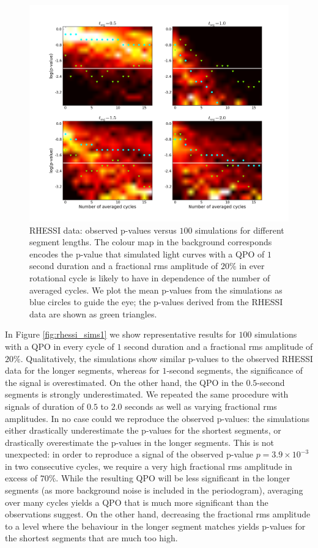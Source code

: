 \documentclass{emulateapj}
\begin{document}
\begin{figure}[htbp]
\begin{center}
\includegraphics[width=\textwidth]{1806_rhessi_1ssignal_all_pvalues.png}
\caption{RHESSI data: observed p-values versus $100$ simulations for different segment lengths. The colour map in the background corresponds encodes the p-value that simulated light curves with a QPO of $1$ second duration and a fractional rms amplitude of $20\%$ in ever rotational cycle is likely to have in dependence of the number of averaged cycles. We plot the mean p-values from the simulations as blue circles to guide the eye; the p-values derived from the RHESSI data are shown as green triangles.}
\label{fig:rhessi_sims1_pvalues}
\end{center}
\end{figure}

In Figure \ref{fig:rhessi_sims1} we show representative results for $100$ simulations with a QPO in every cycle of $1$ second duration and a fractional rms amplitude of $20\%$. Qualitatively, the simulations show similar p-values to the observed RHESSI data for the longer segments, whereas for $1$-second segments, the significance of the signal is overestimated. On the other hand, the QPO in the $0.5$-second segments is strongly underestimated. 
We repeated the same procedure with signals of duration of $0.5$ to $2.0$ seconds as well as varying fractional rms amplitudes. In no case could we reproduce the observed p-values: the simulations either drastically underestimate the p-values for the shortest segments, or drastically overestimate the p-values in the longer segments. 
This is not unexpected: in order to reproduce a signal of the observed p-value $p = 3.9 \times 10^{-3}$ in two consecutive cycles, we require a very high fractional rms amplitude in excess of $70\%$. While the resulting QPO will be less significant in the longer segments (as more background noise is included in the periodogram), averaging over many cycles yields a QPO that is much more significant than the observations suggest. On the other hand, decreasing the fractional rms amplitude to a level where the behaviour in the longer segment matches yields p-values for the shortest segments that are much too high. 
\end{document}
